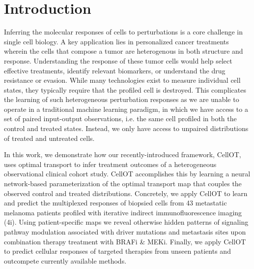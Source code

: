 \section{Introduction}
Inferring the molecular responses of cells to perturbations is a core challenge in single cell biology.
A key application lies in personalized cancer treatments wherein the cells that compose a tumor are heterogenous in both structure and response.
Understanding the response of these tumor cells would help select effective treatments, identify relevant biomarkers, or understand the drug resistance or evasion.
While many technologies exist to measure individual cell states, they typically require that the profiled cell is destroyed.
This complicates the learning of such heterogeneous perturbation responses as we are unable to operate in a traditional machine learning paradigm, in which we have access to a set of paired input-output observations, i.e.
the same cell profiled in both the control and treated states.
Instead, we only have access to unpaired distributions of treated and untreated cells.

In this work, we demonstrate how our recently-introduced framework, CellOT, uses optimal transport to infer treatment outcomes of a heterogeneous observational clinical cohort study.
CellOT accomplishes this by learning a neural network-based parameterization of the optimal transport map that couples the observed control and treated distributions.
Concretely, we apply CellOT to learn and predict the multiplexed responses of biopsied cells from 43 metastatic melanoma patients profiled with iterative indirect immunofluorescence imaging (4i).
Using patient-specific maps we reveal otherwise hidden patterns of signaling pathway modulation associated with driver mutations and metastasis sites upon combination therapy treatment with BRAFi \& MEKi.
Finally, we apply CellOT to predict cellular responses of targeted therapies from unseen patients and outcompete currently available methods.

